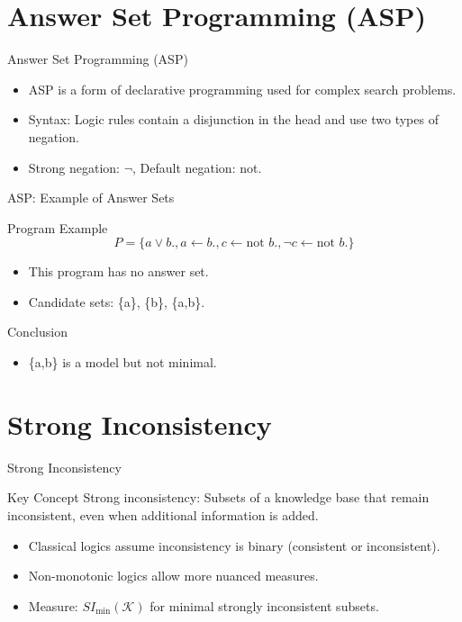 \section{Answer Set Programming (ASP)}

\begin{frame}{Answer Set Programming (ASP)}
    \begin{itemize}
        \item ASP is a form of declarative programming used for complex search problems.
        \item Syntax: Logic rules contain a disjunction in the head and use two types of negation.
        \item Strong negation: \(\neg\), Default negation: not.
    \end{itemize}
\end{frame}

\begin{frame}{ASP: Example of Answer Sets}
    \begin{exampleblock}{Program Example}
        \[
            P = \{a \lor b., a \leftarrow b., c \leftarrow \text{not } b., \neg c \leftarrow \text{not } b.\}
        \]
        \begin{itemize}
            \item This program has no answer set.
            \item Candidate sets: \{a\}, \{b\}, \{a,b\}.
        \end{itemize}
    \end{exampleblock}

    \begin{block}{Conclusion}
        \begin{itemize}
            \item \{a,b\} is a model but not minimal.
        \end{itemize}
    \end{block}
\end{frame}

\section{Strong Inconsistency}

\begin{frame}{Strong Inconsistency}
    \begin{block}{Key Concept}
        Strong inconsistency: Subsets of a knowledge base that remain inconsistent, even when additional information is added.
    \end{block}

    \begin{itemize}
        \item Classical logics assume inconsistency is binary (consistent or inconsistent).
        \item Non-monotonic logics allow more nuanced measures.
        \item Measure: \(SI_{\min}(\mathcal{K})\) for minimal strongly inconsistent subsets.
    \end{itemize}
\end{frame}


